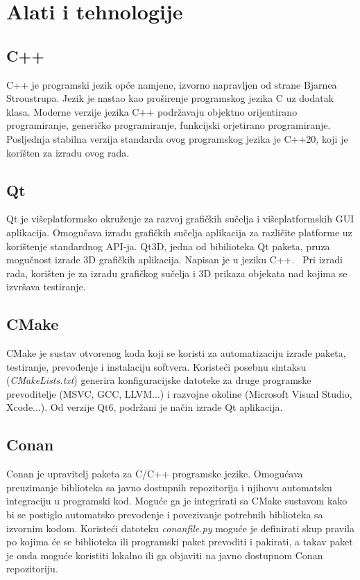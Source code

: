 \chapter{Alati i tehnologije}

\section{C++}

C++ je programski jezik opće namjene, izvorno napravljen od strane Bjarnea Stroustrupa.
Jezik je nastao kao proširenje programskog jezika C uz dodatak klasa. Moderne verzije jezika C++
podržavaju objektno orijentirano programiranje, generičko programiranje, funkcijski orjetirano programiranje.
Posljednja stabilna verzija standarda ovog programskog jezika je C++20, koji je korišten za izradu ovog rada.~\cite{cpp}

\section{Qt}

Qt je višeplatformsko okruženje za razvoj grafičkih sučelja i višeplatformskih GUI aplikacija.
Omogučava izradu grafičkih sučelja aplikacija za različite platforme uz korištenje standardnog API-ja.
Qt3D, jedna od bibilioteka Qt paketa, pruza mogučnost izrade 3D grafičkih aplikacija. Napisan je u jeziku C++.~\cite{qt}
Pri izradi rada, korišten je za izradu grafičkog sučelja i 3D prikaza objekata nad kojima se izvršava testiranje.

\section{CMake}

CMake je sustav otvorenog koda koji se koristi za automatizaciju izrade paketa, testiranje, prevođenje i instalaciju
softvera. Koristeći posebnu sintaksu (\textit{CMakeLists.txt}) generira konfiguracijske datoteke za druge programske prevoditelje
(MSVC, GCC, LLVM...) i razvojne okoline (Microsoft Visual Studio, Xcode...). Od verzije Qt6, podržani je način izrade Qt aplikacija. ~\cite{cmake}

\pagebreak
\section{Conan}

Conan je upravitelj paketa za C/C++ programske jezike. Omogućava preuzimanje biblioteka sa javno dostupnih repozitorija
i njihovu automatsku integraciju u programski kod. Moguće ga je integrirati sa CMake sustavom kako bi se postiglo automatsko
prevođenje i povezivanje potrebnih biblioteka sa izvornim kodom. Koristeći datoteku \textit{conanfile.py} moguće je definirati
skup pravila po kojima će se biblioteka ili programski paket prevoditi i pakirati, a takav paket je onda moguće koristiti lokalno
ili ga objaviti na javno dostupnom Conan repozitoriju. \\

